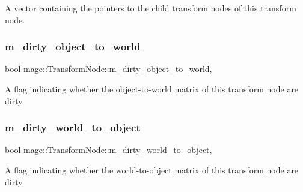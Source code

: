 A vector containing the pointers to the child transform nodes of this transform node. \hypertarget{classmage_1_1_transform_node_a389151fddc72499d0be4e725622d99b9}{}\label{classmage_1_1_transform_node_a389151fddc72499d0be4e725622d99b9} 
\subsubsection{\texorpdfstring{m\+\_\+dirty\+\_\+object\+\_\+to\+\_\+world}{m\_dirty\_object\_to\_world}}
{\footnotesize\ttfamily bool mage\+::\+Transform\+Node\+::m\+\_\+dirty\+\_\+object\+\_\+to\+\_\+world\hspace{0.3cm}{\ttfamily [mutable]}, {\ttfamily [private]}}

A flag indicating whether the object-\/to-\/world matrix of this transform node are dirty. \hypertarget{classmage_1_1_transform_node_acb9046e0096ada337e1978f016daa144}{}\label{classmage_1_1_transform_node_acb9046e0096ada337e1978f016daa144} 
\subsubsection{\texorpdfstring{m\+\_\+dirty\+\_\+world\+\_\+to\+\_\+object}{m\_dirty\_world\_to\_object}}
{\footnotesize\ttfamily bool mage\+::\+Transform\+Node\+::m\+\_\+dirty\+\_\+world\+\_\+to\+\_\+object\hspace{0.3cm}{\ttfamily [mutable]}, {\ttfamily [private]}}

A flag indicating whether the world-\/to-\/object matrix of this transform node are dirty. \hypertarget{classmage_1_1_transform_node_a79de447d6d40226d7ceb276007f5fbeb}{}\label{classmage_1_1_transform_node_a79de447d6d40226d7ceb276007f5fbeb} 
